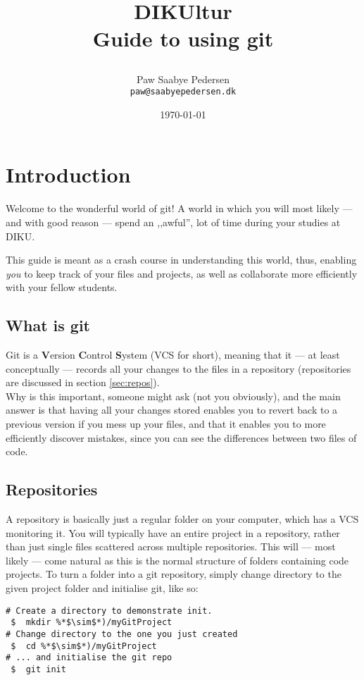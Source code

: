 \documentclass[11pt,a4paper,oneside,final,titlepage]{article}
\title{
    \LARGE{DIKUltur}\\
    \huge{Guide to using git}
    \author{
        Paw Saabye Pedersen\\
        \texttt{paw@saabyepedersen.dk}
    }
    \date{\today}
}
\begin{document}
\maketitle
\thispagestyle{empty}

\clearpage
\thispagestyle{empty}
\tableofcontents
\clearpage

\thispagestyle{fancyplain}
\setcounter{page}{1}

\section{Introduction}
Welcome to the wonderful world of git! A world in which you will most likely
--- and with good reason --- spend an ,,awful'', lot of time during your studies at
DIKU.

This guide is meant as a crash course in understanding this world, thus, enabling
\textit{you} to keep track of your files and projects, as well as collaborate
more efficiently with your fellow students.

\subsection{What is git}
Git is a \textbf{V}ersion \textbf{C}ontrol \textbf{S}ystem (VCS for short),
meaning that it --- at least conceptually --- records all your changes to the
files in a repository (repositories are discussed in section \ref{sec:repos}).\\
Why is this important, someone might ask (not you obviously), and the main
answer is that having all your changes stored enables you to revert back to a
previous version if you mess up your files, and that it enables you to more
efficiently discover mistakes, since you can see the differences between two
files of code.

\subsection{Repositories}
A repository is basically just a regular folder on your computer, which has a
VCS monitoring it. You will typically have an entire project in a repository,
rather than just single files scattered across multiple repositories. This will
--- most likely --- come natural as this is the normal structure of folders
containing code projects.
To turn a folder into a git repository, simply change directory to the given
project folder and initialise git, like so:

\begin{lstlisting}[name=lst:initialiseRepo,caption=Start monitoring a folder,
                   label=lst:initialiseRepo,style=git]
# Create a directory to demonstrate init.
 $  mkdir %*$\sim$*)/myGitProject
# Change directory to the one you just created
 $  cd %*$\sim$*)/myGitProject
# ... and initialise the git repo
 $  git init
\end{lstlisting}
\end{document}
